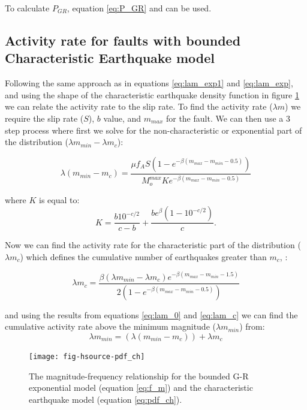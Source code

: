 \begin{enumerate}
To calculate $P_{GR}$, equation \ref{eq:P_GR} and \label{eq:f_m} can be used. 

\subsection{Activity rate for faults with bounded Characteristic Earthquake model} 
\label{sec:rv_flt_ch}

Following the same approach as in equations \ref{eq:lam_exp1} and  \ref{eq:lam_exp}, and using the shape of the characteristic 
earthquake density function in figure \ref{fig:pdf} we can relate the activity rate to the slip rate. To find the activity 
rate ($\lambda m$) we require the slip rate ($S$), $b$ value, and $m_{max}$ for the fault. We can then use 
a 3 step process where first we solve for the non-characteristic or exponential part of the distribution ($\lambda m_{min} - \lambda m_{c}$):

\begin{equation} \label{eq:lam_0}
\lambda (m_{min} - m_{c}) = \frac { \mu f_A S (1-e ^{- \beta (m_{max} - m_{min} - 0.5)}) } { M_o^{max} K e ^{- \beta (m_{max} - m_{min} - 0.5)  }  }
\end{equation}

where $K$ is equal to:
\begin{equation}
K = \frac { b 10 ^ {-c/2} }  { c- b } + \frac { b e ^{\beta} (1 - 10^{-c/2})  }  {  c } .
\end{equation}

Now we can find  the activity rate for the characteristic part of the distribution ($\lambda m_{c}$) which defines the cumulative number of earthquakes greater than $m_c$,  :

\begin{equation} \label{eq:lam_c}
\lambda m_c = \frac { \beta (\lambda m_{min} - \lambda m_{c}) e ^{-\beta ( m_{max} - m_{min} - 1.5)} }  { 2 ( 1 -  e ^{- \beta (m_{max} - m_{min} - 0.5)  }) }
\end{equation}

and using the results from equations \ref{eq:lam_0} and \ref{eq:lam_c} we can find the cumulative activity rate above the minimum magnitude ($\lambda m_{min}$) from:
\begin{equation} \label{eq:lam_ch}
\lambda m_{min} = (\lambda (m_{min} - m_{c})) + \lambda m_{c}
\end{equation}

\begin{figure}[htp]
\centerline{\texttt{[image: fig-hsource-pdf\_ch]}}
\caption{The magnitude-frequency relationship for the bounded G-R exponential model (equation \ref{eq:f_m}) and the characteristic earthquake model (equation \ref{eq:pdf_ch}).}
\label{fig:pdf}
\end{figure}


\end{enumerate}
